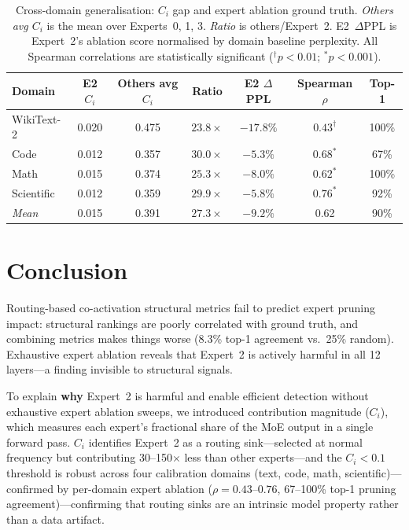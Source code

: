 \documentclass{article}
\begin{document}
\begin{table}[t]
\caption{Cross-domain generalisation: $C_i$ gap and expert ablation ground truth. \emph{Others avg $C_i$} is the mean over Experts~0, 1, 3. \emph{Ratio} is others/Expert~2. E2~$\Delta$PPL is Expert~2's ablation score normalised by domain baseline perplexity. All Spearman correlations are statistically significant ($^\dagger p<0.01$; $^{*}p<0.001$).}
\label{tab:domain_generalization}
\centering
\small
\begin{tabular}{lcccccc}
\toprule
\textbf{Domain} & \textbf{E2 $C_i$} & \textbf{Others avg $C_i$} & \textbf{Ratio} & \textbf{E2 $\Delta$PPL} & \textbf{Spearman $\rho$} & \textbf{Top-1} \\
\midrule
WikiText-2 & 0.020 & 0.475 & $23.8\times$ & $-17.8\%$ & $0.43^\dagger$ & 100\% \\
Code       & 0.012 & 0.357 & $30.0\times$ & $-5.3\%$  & $0.68^{*}$    &  67\% \\
Math       & 0.015 & 0.374 & $25.3\times$ & $-8.0\%$  & $0.62^{*}$    & 100\% \\
Scientific & 0.012 & 0.359 & $29.9\times$ & $-5.8\%$  & $0.76^{*}$    &  92\% \\
\midrule
\textit{Mean} & 0.015 & 0.391 & $27.3\times$ & $-9.2\%$ & 0.62 & 90\% \\
\bottomrule
\end{tabular}
\end{table}

\section{Conclusion}

Routing-based co-activation structural metrics fail to predict expert pruning impact: structural rankings are poorly correlated with ground truth, and combining metrics makes things worse (8.3\% top-1 agreement vs.\ 25\% random). Exhaustive expert ablation reveals that Expert~2 is actively harmful in all 12 layers---a finding invisible to structural signals.

To explain \textbf{why} Expert~2 is harmful and enable efficient detection without exhaustive expert ablation sweeps, we introduced contribution magnitude ($C_i$), which measures each expert's fractional share of the MoE output in a single forward pass. $C_i$ identifies Expert~2 as a routing sink---selected at normal frequency but contributing 30--150$\times$ less than other experts---and the $C_i < 0.1$ threshold is robust across four calibration domains (text, code, math, scientific)---confirmed by per-domain expert ablation ($\rho = 0.43$--$0.76$, 67--100\% top-1 pruning agreement)---confirming that routing sinks are an intrinsic model property rather than a data artifact.
\end{document}

